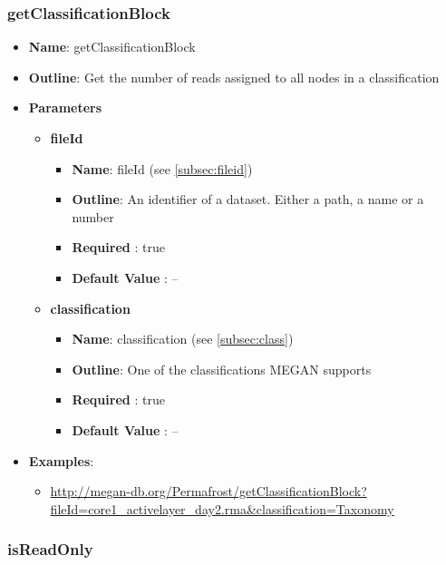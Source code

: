 \documentclass[11pt]{article}
\begin{document}
\subsubsection{getClassificationBlock}

\begin{itemize}
	\item \textbf{Name}: getClassificationBlock
	\item \textbf{Outline}: Get the number of reads assigned to all nodes in a classification
	\item \textbf{Parameters}
		\begin{itemize}
			\item \textbf{fileId}
				\begin{itemize}
					\item \textbf{Name}: fileId (see \ref{subsec:fileid})
					\item \textbf{Outline}: An identifier of a dataset. Either a path, a name or a number
					\item \textbf{Required} : true
					\item \textbf{Default Value} : --
				\end{itemize}
			\item \textbf{classification}
				\begin{itemize}
					\item \textbf{Name}: classification (see \ref{subsec:class})
					\item \textbf{Outline}: One of the classifications MEGAN supports
					\item \textbf{Required} : true
					\item \textbf{Default Value} : --
				\end{itemize}
		\end{itemize}
	\item \textbf{Examples}:
		\begin{itemize}
			\item \url{http://megan-db.org/Permafrost/getClassificationBlock?fileId=core1_activelayer_day2.rma&classification=Taxonomy}
		\end{itemize}
\end{itemize}

\subsubsection{isReadOnly}
\end{document}
